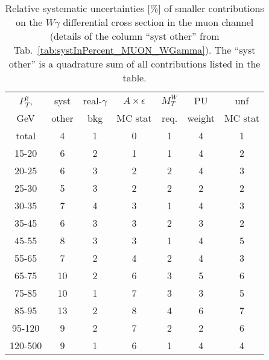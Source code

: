 \begin{table}[h]
  \scriptsize
  \begin{center}
  \caption{Relative systematic uncertainties [\%] of smaller contributions  on the $W\gamma$ differential cross section in the muon channel (details of the column ``syst other'' from Tab.~\ref{tab:systInPercent_MUON_WGamma}). The ``syst other'' is a quadrature sum of all contributions listed in the table.}
  \begin{tabular}{|c|c|c|c|c|c|c|}
    $P_T^{\gamma}$,  & syst  & real-$\gamma$ & $A\times\epsilon$ & $M_T^W$ & PU    & unf      \\
    GeV            & other & bkg           & MC stat           & req.   & weight & MC stat \\ \hline
    total  & 4 & 1 & 0 & 1 & 4 & 1 \\ \hline
    15-20 & 6 & 2 & 1 & 1 & 4 & 2 \\ \hline
    20-25 & 6 & 3 & 2 & 2 & 4 & 3 \\ \hline
    25-30 & 5 & 3 & 2 & 2 & 2 & 2 \\ \hline
    30-35 & 7 & 4 & 3 & 1 & 4 & 3 \\ \hline
    35-45 & 6 & 3 & 3 & 2 & 3 & 2 \\ \hline
    45-55 & 8 & 3 & 3 & 1 & 4 & 5 \\ \hline
    55-65 & 7 & 2 & 4 & 2 & 4 & 3 \\ \hline
    65-75 & 10 & 2 & 6 & 3 & 5 & 6 \\ \hline
    75-85 & 10 & 1 & 7 & 3 & 3 & 5 \\ \hline
    85-95 & 13 & 2 & 8 & 4 & 6 & 7 \\ \hline
    95-120 & 9 & 2 & 7 & 2 & 2 & 6 \\ \hline
    120-500 & 9 & 1 & 6 & 1 & 4 & 4 \\ \hline
  \end{tabular}
  \label{tab:systInPercentSmallSysts_MUON_WGamma}
  \end{center}
\end{table}

